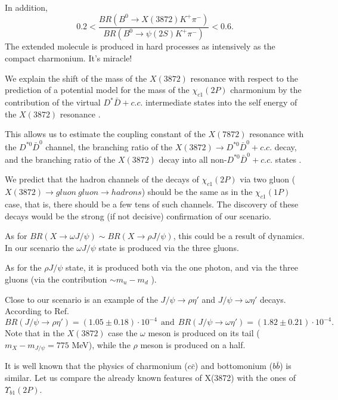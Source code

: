 \documentclass[aps,preprint,groupedaddress,floatfix]{revtex4}
\begin{document}
  In addition, \cite{Belle2015,NNA3872,pdg-2018,Belle2009}
\begin{equation}
 0.2<\frac{BR(B^0\to X(3872)K^+\pi^-)}{BR(B^0\to\psi(2S)K^+\pi^-)}<0.6.\nonumber
\end{equation}
The extended molecule is produced in hard processes as intensively
as the compact charmonium.  It's miracle!

We explain the shift of  the mass of the
 $X(3872)$ resonance with respect to the prediction of a potential model for the mass of the
$\chi_{c1}(2P)$ charmonium by the contribution of the virtual
$D^*\bar D+c.c.$ intermediate states into the self energy of the
$X(3872)$ resonance \cite{NNA+EVR+,NNA3872}.


 This allows us to estimate the coupling constant of the
$X(7872)$ resonance with the $D^{*0}\bar D^0$ channel, the
branching ratio of the $X(3872) \to D^{*0}\bar D^0 + c.c.$ decay,
and the branching ratio of  the $X(3872)$ decay into all
non-$D^{*0}\bar D^0 + c.c.$ states
\cite{NNA+EVR,NNA+EVR+,NNA3872}.

 We \cite{NNA+EVR+,NNA3872} predict that the hadron channels of the decays of
$\chi_{c1}(2P)$ via two gluon ( $X(3872)\to gluon\ gluon\to
hadrons$) should be the same as in the  $\chi_{c1}(1P)$ case, that
is, there should be a few tens of such channels. The discovery of
these decays would be the strong (if not decisive) confirmation of
our scenario.

 As for $BR(X\to\omega J/\psi)\sim BR(X\to\rho
J/\psi)$, this could be a result of dynamics. In our scenario the
$\omega J/\psi$ state is produced via the three gluons.

 As for the $\rho J/\psi$ state, it
is produced both via the one photon, and via the three gluons (via
the contribution $\sim m_u-m_d$ ).

 Close to our scenario is an example of the
$J/\psi\to\rho\eta'$ and $J/\psi\to\omega\eta'$  decays. According
to Ref. \cite{pdg-2018}
\begin{equation}
\label{Jpsi}
 BR(J/\psi\to\rho\eta')=(1.05\pm 0.18)\cdot10^{-4}\ \ \mbox{and}\ \
BR(J/\psi\to\omega\eta')=(1.82\pm 0.21)\cdot10^{-4}.
\end{equation}
Note that in the $X(3872)$ case the $\omega$ meson is produced on
its tail ($m_X-m_{J/\psi}=775$ MeV), while the $\rho$ meson is
produced on a half.

It is well known that the physics of charmonium ($c\bar c$) and
bottomonium ($b\bar b$) is similar. Let us compare the already
known features of X(3872) with the ones of $\Upsilon_{b1}(2P)$.
\end{document}
